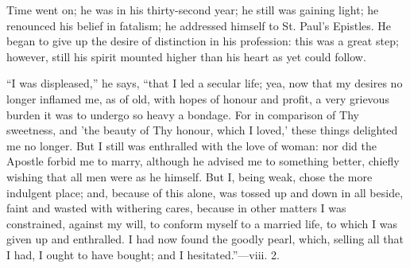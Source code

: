 Time went on; he was in his thirty-second year; he still was
gaining light; he renounced his belief in fatalism; he addressed
himself to St. Paul's Epistles. He began to give up the desire of
distinction in his profession: this was a great step; however, still
his spirit mounted higher than his heart as yet could follow.

``I was displeased,'' he says, ``that I led a secular
life; yea, now that my desires no longer inflamed me, as of old, with
hopes of honour and profit, a very grievous burden it was to undergo
so heavy a bondage. For in comparison of
Thy sweetness, and 'the beauty of Thy honour, which I loved,' these
things delighted me no longer. But I still was enthralled with the
love of woman: nor did the Apostle forbid me to marry, although he
advised me to something better, chiefly wishing that all men were as
he himself. But I, being weak, chose the more indulgent place; and,
because of this alone, was tossed up and down in all beside, faint and
wasted with withering cares, because in other matters I was
constrained, against my will, to conform myself to a married life, to
which I was given up and enthralled. I had now found the goodly pearl,
which, selling all that I had, I ought to have bought; and I
hesitated.''—viii. 2.

